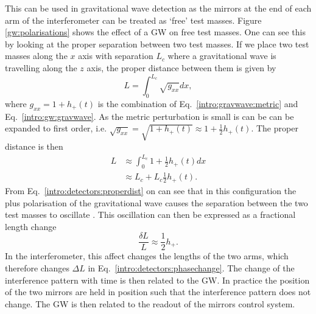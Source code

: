 %
This can be used in gravitational wave detection as the mirrors at the end of each arm of the interferometer can be treated as `free' test masses.
Figure \ref{gw:polarisations} shows the effect of a \gls{GW} on free test masses.
One can see this by looking at the proper separation between two test masses. 
If we place two test masses along the $x$ axis with separation $L_c$ where a gravitational wave is travelling along the $z$ axis, the proper distance between them is given by
\begin{equation}
    L = \int_{0}^{L_c} \sqrt{g_{xx}} dx,
\end{equation}
where $g_{xx} = 1 + h_{+}(t)$ is the combination of Eq.~\ref{intro:gravwave:metric} and Eq.~\ref{intro:gw:gravwave}. 
As the metric perturbation is small is can be can be expanded to first order, i.e. $\sqrt{g_{xx}} = \sqrt{1 + h_{+}(t)} \approx 1 + \frac{1}{2}h_{+}(t)$.
The proper distance is then
\begin{equation}
    \label{intro:detectors:properdist}
    \begin{split}
     L &\approx \int_{0}^{L_c} 1 + \frac{1}{2}h_{+}(t) dx \\
      &\approx L_c + L_c \frac{1}{2}h_{+}(t).
    \end{split}
\end{equation}
From Eq.~\ref{intro:detectors:properdist} on can see that in this configuration the plus polarisation of the gravitational wave causes the separation between the two test masses to oscillate \citep{flanagan2005BasicsGravitational}.
This oscillation can then be expressed as a fractional length change 
\begin{equation}
    \label{intro:detectors:fraclength}
    \frac{\delta L}{L} \approx \frac{1}{2} h_{+}.
\end{equation}
In the interferometer, this affect changes the lengths of the two arms, which therefore changes $\Delta L$ in Eq.~\ref{intro:detectors:phasechange}.
The change of the interference pattern with time is then related to the \gls{GW}.
In practice the position of the two mirrors are held in position such that the interference pattern does not change.
The \gls{GW} is then related to the readout of the mirrors control system.

